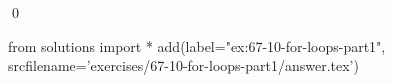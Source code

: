 
\begin{ex}
  \label{ex:67-10-for-loops-part1}
  
  \qed
\end{ex}
\begin{python0}
from solutions import *
add(label="ex:67-10-for-loops-part1",
    srcfilename='exercises/67-10-for-loops-part1/answer.tex')
\end{python0}
